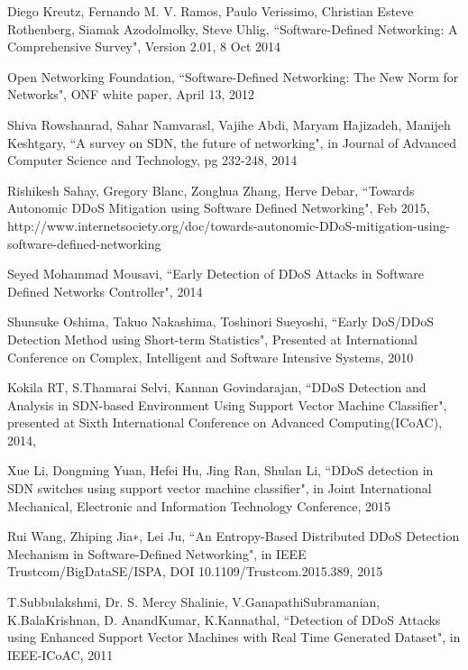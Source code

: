 \documentclass[12pt,a4paper,final]{report}
\begin{document}
\begin{thebibliography}{9}
Diego Kreutz, Fernando M. V. Ramos, Paulo Verissimo, Christian Esteve Rothenberg, Siamak Azodolmolky, Steve Uhlig,
``Software-Defined Networking: A Comprehensive Survey",
Version 2.01,
8 Oct 2014

Open Networking Foundation, 
``Software-Defined Networking: The New Norm for Networks",
ONF white paper, 
April 13, 2012

Shiva Rowshanrad, Sahar Namvarasl, Vajihe Abdi, Maryam Hajizadeh, Manijeh Keshtgary,
``A survey on SDN, the future of networking",
in Journal of Advanced Computer Science and Technology,
pg 232-248,
2014

Rishikesh Sahay, Gregory Blanc, Zonghua Zhang, Herve Debar,
``Towards Autonomic DDoS Mitigation using Software Defined Networking",
Feb 2015,
http://www.internetsociety.org/doc/towards-autonomic-DDoS-mitigation-using-software-defined-networking

Seyed Mohammad Mousavi,
``Early Detection of DDoS Attacks in Software Defined Networks Controller",
2014

Shunsuke Oshima, Takuo Nakashima, Toshinori Sueyoshi,
``Early DoS/DDoS Detection Method using Short-term Statistics",
Presented at International Conference on Complex, Intelligent and Software Intensive Systems,
2010

Kokila RT, S.Thamarai Selvi, Kannan Govindarajan,
``DDoS Detection and Analysis in SDN-based Environment Using Support Vector Machine Classifier",
presented at Sixth International Conference on Advanced Computing(ICoAC),
2014,

Xue Li, Dongming Yuan, Hefei Hu, Jing Ran, Shulan Li, 
``DDoS detection in SDN switches using support vector machine classifier",
in Joint International Mechanical, Electronic and Information Technology Conference, 
2015

Rui Wang, Zhiping Jia∗, Lei Ju,
``An Entropy-Based Distributed DDoS Detection Mechanism in Software-Defined Networking",
in IEEE Trustcom/BigDataSE/ISPA,
DOI 10.1109/Trustcom.2015.389,
2015

T.Subbulakshmi, Dr. S. Mercy Shalinie, V.GanapathiSubramanian, K.BalaKrishnan, D. AnandKumar, K.Kannathal,
``Detection of DDoS Attacks using Enhanced Support Vector Machines with Real Time Generated Dataset",
in IEEE-ICoAC, 
2011


\end{thebibliography}
\end{document}
